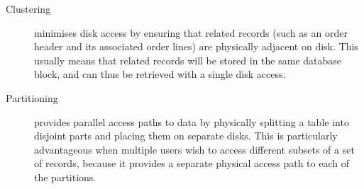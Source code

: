 \documentclass{llncs}
\begin{document}
\begin{description}

	\item[Clustering] minimises disk access by ensuring that related
	records (such as an order header and its associated order lines) are
	physically adjacent on disk. This usually means that related records
	will be stored in the same database block, and can thus be retrieved
	with a single disk access.

% 

	\item[Partitioning] provides parallel access paths to data by
	physically splitting a table into disjoint parts and placing them on
	separate disks. This is particularly advantageous when multiple
	users wish to access different subsets of a set of records, because
	it provides a separate physical access path to each of the
	partitions.

% 


\end{description}
\end{document}

